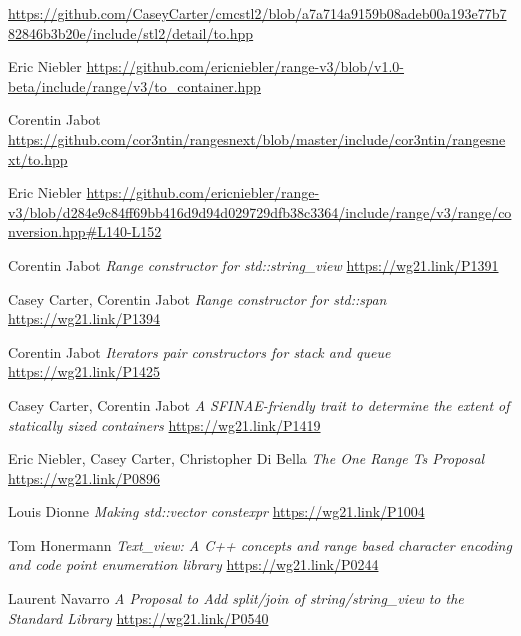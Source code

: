 \documentclass{wg21}
\begin{document}
\begin{thebibliography}{9}


	\url{https://github.com/CaseyCarter/cmcstl2/blob/a7a714a9159b08adeb00a193e77b782846b3b20e/include/stl2/detail/to.hpp}

    Eric Niebler
	\url{https://github.com/ericniebler/range-v3/blob/v1.0-beta/include/range/v3/to_container.hpp}
    
Corentin Jabot
\url{https://github.com/cor3ntin/rangesnext/blob/master/include/cor3ntin/rangesnext/to.hpp}

Eric Niebler
\url{https://github.com/ericniebler/range-v3/blob/d284e9c84ff69bb416d9d94d029729dfb38c3364/include/range/v3/range/conversion.hpp#L140-L152}

	Corentin Jabot
	\emph{Range constructor for std::string\_view}\newline
	\url{https://wg21.link/P1391}

	Casey Carter, Corentin Jabot
	\emph{Range constructor for std::span}\newline
	\url{https://wg21.link/P1394}

	Corentin Jabot
	\emph{Iterators pair constructors for stack and queue}\newline
	\url{https://wg21.link/P1425}

	Casey Carter, Corentin Jabot
	\emph{A SFINAE-friendly trait to determine the extent of statically sized containers}\newline
	\url{https://wg21.link/P1419}

    Eric Niebler, Casey Carter, Christopher Di Bella
    \emph{The One Range Ts Proposal}\newline
    \url{https://wg21.link/P0896}

    Louis Dionne
    \emph{Making std::vector constexpr}\newline
    \url{https://wg21.link/P1004}

    Tom Honermann
    \emph{Text_view: A C++ concepts and range based character encoding and code point enumeration library}\newline
    \url{https://wg21.link/P0244}

    Laurent Navarro
    \emph{A Proposal to Add split/join of string/string_view to the Standard Library}\newline
    \url{https://wg21.link/P0540}


\end{thebibliography}
\end{document}
